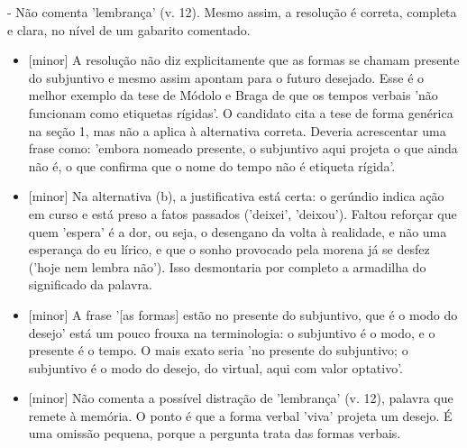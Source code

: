 \documentclass{article}%
\begin{document}
{-} Não comenta 'lembrança' (v. 12).\newline%
\newline%
Mesmo assim, a resolução é correta, completa e clara, no nível de um gabarito comentado.%
\begin{itemize}%
\item%
{[}minor{]} A resolução não diz explicitamente que as formas se chamam presente do subjuntivo e mesmo assim apontam para o futuro desejado. Esse é o melhor exemplo da tese de Módolo e Braga de que os tempos verbais 'não funcionam como etiquetas rígidas'. O candidato cita a tese de forma genérica na seção 1, mas não a aplica à alternativa correta. Deveria acrescentar uma frase como: 'embora nomeado presente, o subjuntivo aqui projeta o que ainda não é, o que confirma que o nome do tempo não é etiqueta rígida'.%
\item%
{[}minor{]} Na alternativa (b), a justificativa está certa: o gerúndio indica ação em curso e está preso a fatos passados ('deixei', 'deixou'). Faltou reforçar que quem 'espera' é a dor, ou seja, o desengano da volta à realidade, e não uma esperança do eu lírico, e que o sonho provocado pela morena já se desfez ('hoje nem lembra não'). Isso desmontaria por completo a armadilha do significado da palavra.%
\item%
{[}minor{]} A frase '{[}as formas{]} estão no presente do subjuntivo, que é o modo do desejo' está um pouco frouxa na terminologia: o subjuntivo é o modo, e o presente é o tempo. O mais exato seria 'no presente do subjuntivo; o subjuntivo é o modo do desejo, do virtual, aqui com valor optativo'.%
\item%
{[}minor{]} Não comenta a possível distração de 'lembrança' (v. 12), palavra que remete à memória. O ponto é que a forma verbal 'viva' projeta um desejo. É uma omissão pequena, porque a pergunta trata das formas verbais.%
\end{itemize}%
\end{document}
